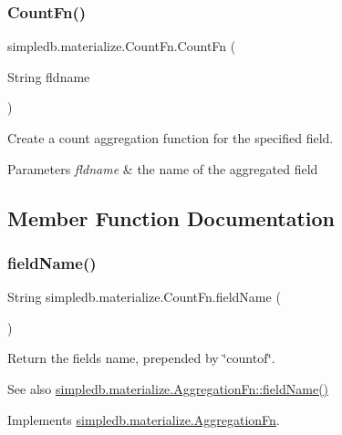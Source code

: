 \subsubsection{\texorpdfstring{Count\+Fn()}{CountFn()}}
{\footnotesize\ttfamily simpledb.\+materialize.\+Count\+Fn.\+Count\+Fn (\begin{DoxyParamCaption}\item[{String}]{fldname }\end{DoxyParamCaption})\hspace{0.3cm}{\ttfamily [inline]}}

Create a count aggregation function for the specified field. 
\begin{DoxyParams}{Parameters}
{\em fldname} & the name of the aggregated field \\
\hline
\end{DoxyParams}


\subsection{Member Function Documentation}
\mbox{\label{classsimpledb_1_1materialize_1_1CountFn_a283e9fa1325fd5f81821ef3d3fdcec27}} 
\subsubsection{\texorpdfstring{field\+Name()}{fieldName()}}
{\footnotesize\ttfamily String simpledb.\+materialize.\+Count\+Fn.\+field\+Name (\begin{DoxyParamCaption}{ }\end{DoxyParamCaption})\hspace{0.3cm}{\ttfamily [inline]}}

Return the field\textquotesingle{}s name, prepended by \char`\"{}countof\char`\"{}. \begin{DoxySeeAlso}{See also}
\hyperlink{interfacesimpledb_1_1materialize_1_1AggregationFn_a03cbdf13e41c3e6ea0b8a76863cd58cf}{simpledb.\+materialize.\+Aggregation\+Fn\+::field\+Name()} 
\end{DoxySeeAlso}


Implements \hyperlink{interfacesimpledb_1_1materialize_1_1AggregationFn_a03cbdf13e41c3e6ea0b8a76863cd58cf}{simpledb.\+materialize.\+Aggregation\+Fn}.

